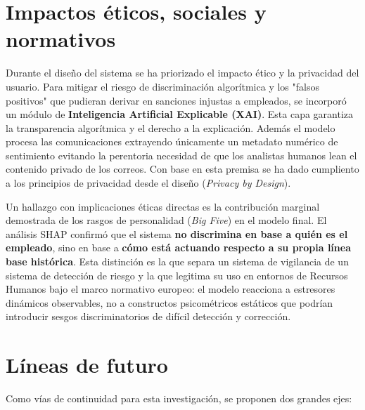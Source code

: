 \documentclass[IB]{TFUOC}%
\begin{document}
\section{Impactos éticos, sociales y normativos}
Durante el diseño del sistema se ha priorizado el impacto ético y la privacidad del usuario. Para mitigar el riesgo de discriminación algorítmica y los "falsos positivos" que pudieran derivar en sanciones injustas a empleados, se incorporó un módulo de \textbf{Inteligencia Artificial Explicable (XAI)}. Esta capa garantiza la transparencia algorítmica y el derecho a la explicación. Además el modelo procesa las comunicaciones extrayendo únicamente un metadato numérico de sentimiento evitando la perentoria necesidad de que los analistas humanos lean el contenido privado de los correos. Con base en esta premisa se ha dado cumpliento a los principios de privacidad desde el diseño (\textit{Privacy by Design}).

\medskip
\noindent Un hallazgo con implicaciones éticas directas es la contribución marginal demostrada de los rasgos de personalidad (\textit{Big Five}) en el modelo final. El análisis SHAP confirmó que el sistema \textbf{no discrimina en base a quién es el empleado}, sino en base a \textbf{cómo está actuando respecto a su propia línea base histórica}. Esta distinción es la que separa un sistema de vigilancia de un sistema de detección de riesgo y la que legitima 
su uso en entornos de Recursos Humanos bajo el marco normativo europeo: el modelo reacciona a estresores dinámicos observables, no a constructos psicométricos estáticos que podrían introducir sesgos discriminatorios de difícil detección y corrección.

\section{Líneas de futuro}
Como vías de continuidad para esta investigación, se proponen dos grandes ejes:
\end{document}
